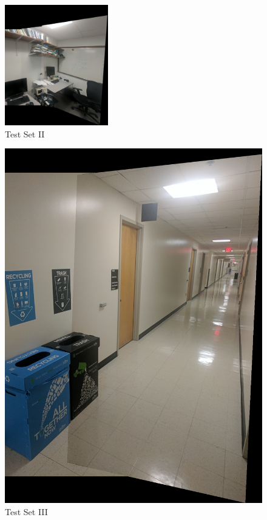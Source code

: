 \documentclass[conference]{IEEEtran}
\begin{document}
\begin{figure}[!htbp]
  \centering
  \includegraphics[width=0.4\textwidth]{phase1/testset2_image123_clear_stitch3.png}
  \caption{Test Set II}
  \label{fig:test_set_II}
\end{figure}


\begin{figure}[!htbp]
  \centering
  \includegraphics[width=0.4\textwidphase]{phase1/testset3_image123_stitch3.png}
  \caption{Test Set III}
  \label{fig:test_set_III}
\end{figure}
\end{document}
